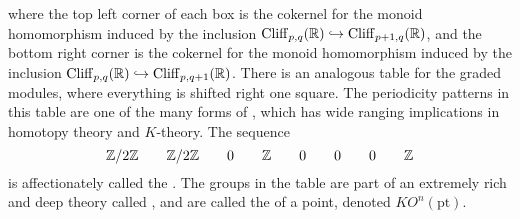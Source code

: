 where the top left corner of each box is the cokernel for the monoid homomorphism
induced by the inclusion $\operatorname{Cliff}_{p,q}(\mathbb{R}) \hookrightarrow \operatorname{Cliff}_{p+1,q}(\mathbb{R})$,
and the bottom right  corner is the cokernel for the monoid homomorphism induced
by the inclusion $\operatorname{Cliff}_{p,q}(\mathbb{R}) \hookrightarrow \operatorname{Cliff}_{p,q+1}(\mathbb{R})$. There
is an analogous table for the graded modules, where everything is shifted right
one square. The periodicity patterns in this table are one of the many
forms of , which has wide ranging implications in homotopy
theory and $K$-theory. The sequence
\[
 \mathbb{Z}/2\mathbb{Z} \qquad \mathbb{Z}/2\mathbb{Z} \qquad 0 \qquad \mathbb{Z} \qquad 0 \qquad 0 \qquad 0 \qquad \mathbb{Z}
\]
is affectionately called the . The groups in the table are part of
an extremely rich and deep theory called , and are called the
 of a point, denoted $KO^n(\mathrm{pt})$.
%